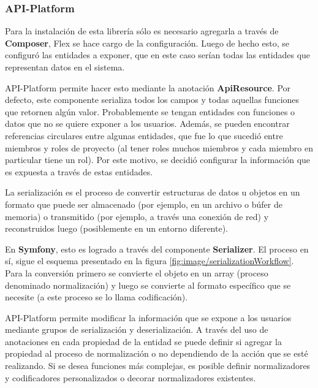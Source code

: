 \subsubsection{API-Platform}%
\label{ssub:api_platform}

Para la instalación de esta librería sólo es necesario agregarla a través de \textbf{Composer}, Flex se hace cargo de la configuración\@. Luego de hecho esto,
se configuró las entidades a exponer, que en este caso serían todas las entidades que representan datos en el sistema.


API-Platform permite hacer esto mediante la anotación \textbf{ApiResource}. Por defecto, este componente serializa todos los campos y todas aquellas funciones
que retornen algún valor\@. Probablemente se tengan entidades con funciones o datos que no se quiere exponer a los usuarios. Además, se pueden encontrar
referencias circulares entre algunas entidades, que fue lo que sucedió entre miembros y roles de proyecto (al tener roles muchos miembros y cada miembro
en particular tiene un rol). Por este motivo, se decidió configurar la información que es expuesta a través de estas entidades.



La serialización es el proceso de convertir estructuras de datos u objetos en un formato que puede ser almacenado (por ejemplo, en un archivo o búfer de memoria)
o transmitido (por ejemplo, a través una conexión de red) y reconstruidos luego (posiblemente en un entorno diferente).~\parencite{serialization}

En \textbf{Symfony}, esto es logrado a través del componente \textbf{Serializer}. El proceso en sí, sigue el esquema presentado en la figura
\ref{fig:image/serializationWorkflow}\@.
Para la conversión primero se convierte el objeto en un array (proceso denominado
normalización) y luego se convierte al formato específico que se necesite (a este proceso se lo llama codificación).

API-Platform permite modificar la información que se expone a los usuarios mediante grupos de serialización y deserialización\@. A través del uso de anotaciones
en cada propiedad de la entidad se puede definir si agregar la propiedad al proceso de normalización o no dependiendo de la acción que se esté realizando.
Si se desea funciones más complejas, es posible definir normalizadores y codificadores personalizados o decorar normalizadores existentes.~\textcite{api-platform-serialization}

